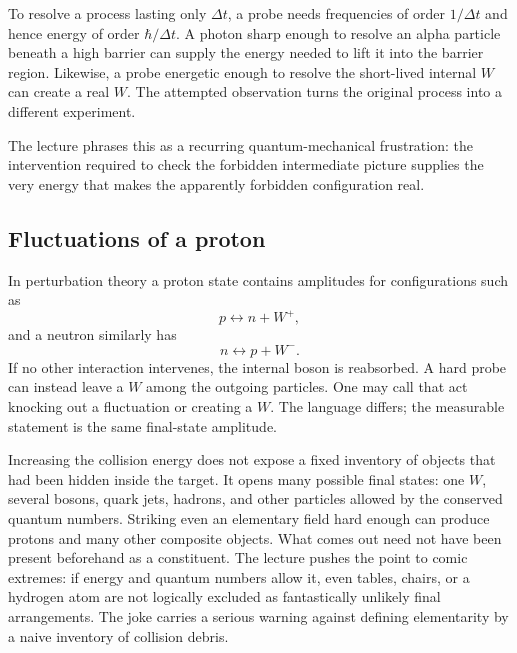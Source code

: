 To resolve a process lasting only \(\Delta t\), a probe needs frequencies of
order \(1/\Delta t\) and hence energy of order \(\hbar/\Delta t\). A photon
sharp enough to resolve an alpha particle beneath a high barrier can supply
the energy needed to lift it into the barrier region. Likewise, a probe
energetic enough to resolve the short-lived internal \(W\) can create a real
\(W\). The attempted observation turns the original process into a different
experiment.

The lecture phrases this as a recurring quantum-mechanical frustration: the
intervention required to check the forbidden intermediate picture supplies
the very energy that makes the apparently forbidden configuration real.

\subsection{Fluctuations of a proton}

In perturbation theory a proton state contains amplitudes for configurations
such as
\begin{equation}
  p\longleftrightarrow n+W^+,
\end{equation}
and a neutron similarly has
\begin{equation}
  n\longleftrightarrow p+W^-.
\end{equation}
If no other interaction intervenes, the internal boson is reabsorbed. A hard
probe can instead leave a \(W\) among the outgoing particles. One may call
that act knocking out a fluctuation or creating a \(W\). The language differs;
the measurable statement is the same final-state amplitude.

\begin{classroomqa}
\end{classroomqa}

Increasing the collision energy does not expose a fixed inventory of objects
that had been hidden inside the target. It opens many possible final states:
one \(W\), several bosons, quark jets, hadrons, and other particles allowed by
the conserved quantum numbers. Striking even an elementary field hard enough
can produce protons and many other composite objects. What comes out need not
have been present beforehand as a constituent. The lecture pushes the point
to comic extremes: if energy and quantum numbers allow it, even tables,
chairs, or a hydrogen atom are not logically excluded as fantastically
unlikely final arrangements. The joke carries a serious warning against
defining elementarity by a naive inventory of collision debris.

